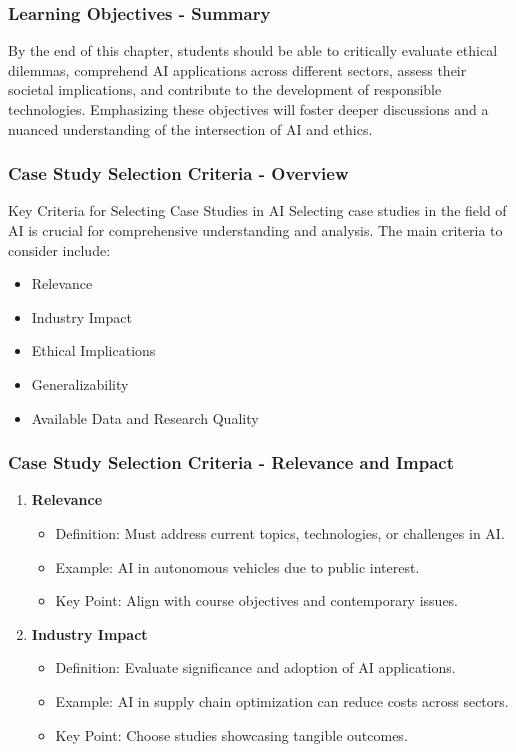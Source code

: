 \documentclass[aspectratio=169]{beamer}
\begin{document}
\begin{frame}[fragile]
    \frametitle{Learning Objectives - Summary}
    By the end of this chapter, students should be able to critically evaluate ethical dilemmas, comprehend AI applications across different sectors, assess their societal implications, and contribute to the development of responsible technologies. 
    Emphasizing these objectives will foster deeper discussions and a nuanced understanding of the intersection of AI and ethics.
\end{frame}

\begin{frame}[fragile]
    \frametitle{Case Study Selection Criteria - Overview}
    \begin{block}{Key Criteria for Selecting Case Studies in AI}
        Selecting case studies in the field of AI is crucial for comprehensive understanding and analysis. The main criteria to consider include:
        \begin{itemize}
            \item Relevance
            \item Industry Impact
            \item Ethical Implications
            \item Generalizability
            \item Available Data and Research Quality
        \end{itemize}
    \end{block}
\end{frame}

\begin{frame}[fragile]
    \frametitle{Case Study Selection Criteria - Relevance and Impact}
    \begin{enumerate}
        \item \textbf{Relevance}
        \begin{itemize}
            \item Definition: Must address current topics, technologies, or challenges in AI.
            \item Example: AI in autonomous vehicles due to public interest.
            \item Key Point: Align with course objectives and contemporary issues.
        \end{itemize}

        \item \textbf{Industry Impact}
        \begin{itemize}
            \item Definition: Evaluate significance and adoption of AI applications.
            \item Example: AI in supply chain optimization can reduce costs across sectors.
            \item Key Point: Choose studies showcasing tangible outcomes.
        \end{itemize}
    \end{enumerate}
\end{frame}
\end{document}

